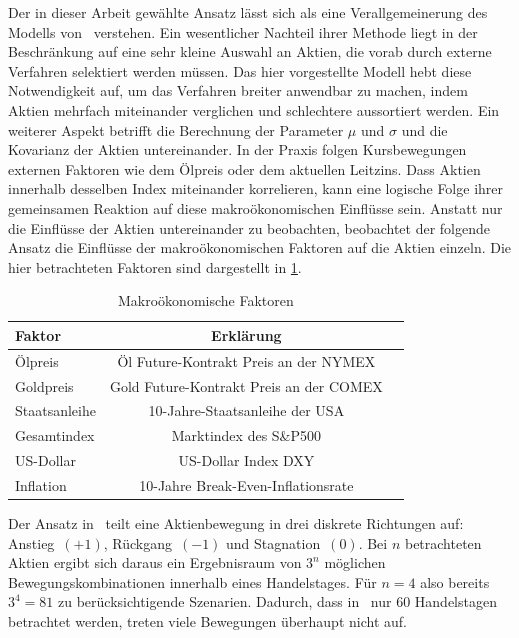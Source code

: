 Der in dieser Arbeit gewählte Ansatz lässt sich als eine Verallgemeinerung des Modells von~\textcite{Ofomataetal2017} verstehen. Ein wesentlicher Nachteil ihrer Methode liegt in der Beschränkung auf eine sehr kleine Auswahl an Aktien, die vorab durch externe Verfahren selektiert werden müssen. Das hier vorgestellte Modell hebt diese Notwendigkeit auf, um das Verfahren breiter anwendbar zu machen, indem Aktien mehrfach miteinander verglichen und schlechtere aussortiert werden. Ein weiterer Aspekt betrifft die Berechnung der Parameter $\mu$ und $\sigma$ und die Kovarianz der Aktien untereinander. In der Praxis folgen Kursbewegungen externen Faktoren wie dem Ölpreis oder dem aktuellen Leitzins. Dass Aktien innerhalb desselben Index miteinander korrelieren, kann eine logische Folge ihrer gemeinsamen Reaktion auf diese makroökonomischen Einflüsse sein. Anstatt nur die Einflüsse der Aktien untereinander zu beobachten, beobachtet der folgende Ansatz die Einflüsse der makroökonomischen Faktoren auf die Aktien einzeln. Die hier betrachteten Faktoren sind dargestellt in \cref{tab:makrofaktoren}.

\begin{table}[h!]
    \centering

    \begin{tabular}{l c c}
        Faktor        & Erklärung                               \\
        \hline
        Ölpreis       & Öl Future-Kontrakt Preis an der NYMEX   \\
        Goldpreis     & Gold Future-Kontrakt Preis an der COMEX \\
        Staatsanleihe & 10-Jahre-Staatsanleihe der USA          \\
        Gesamtindex   & Marktindex des S\&P500                  \\
        US-Dollar     & US-Dollar Index DXY                     \\
        Inflation     & 10-Jahre Break-Even-Inflationsrate      \\
        \hline
    \end{tabular}
    \caption{Makroökonomische Faktoren}\label{tab:makrofaktoren}
\end{table}

Der Ansatz in~\cite{Ofomataetal2017} teilt eine Aktienbewegung in drei diskrete Richtungen auf: Anstieg~$(+1)$, Rückgang~$(-1)$ und Stagnation~$(0)$. Bei $n$ betrachteten Aktien ergibt sich daraus ein Ergebnisraum von $3^n$ möglichen Bewegungskombinationen innerhalb eines Handelstages. Für $n = 4$ also bereits $3^4 = 81$ zu berücksichtigende Szenarien. Dadurch, dass in~\cite{Ofomataetal2017} nur 60 Handelstagen betrachtet werden, treten viele Bewegungen überhaupt nicht auf.

